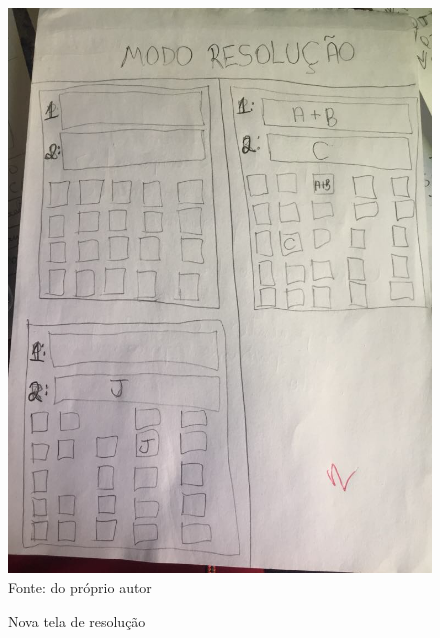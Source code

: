 \begin{figure}[H]
\centering
\caption{Nova tela de resolução}
\includegraphics[scale=0.53]{figuras/prot3.jpg}
\label{prot3}
\\
\small{Fonte: do próprio autor}
\end{figure}


